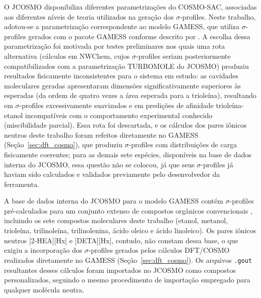 O JCOSMO disponibiliza diferentes parametrizações do COSMO-SAC, associadas aos diferentes níveis de teoria utilizados na geração dos $\sigma$-profiles. Neste trabalho, adotou-se a parametrização correspondente ao modelo GAMESS, que utiliza $\sigma$-profiles gerados com o pacote GAMESS conforme descrito por . A escolha dessa parametrização foi motivada por testes preliminares nos quais uma rota alternativa (cálculos em NWChem, cujos $\sigma$-profiles seriam posteriormente compatibilizados com a parametrização TURBOMOLE do JCOSMO) produziu resultados fisicamente inconsistentes para o sistema em estudo: as cavidades moleculares geradas apresentaram dimensões significativamente superiores às esperadas (da ordem de quatro vezes a área esperada para a trioleína), resultando em $\sigma$-profiles excessivamente suavizados e em predições de afinidade trioleína-etanol incompatíveis com o comportamento experimental conhecido (miscibilidade parcial). Essa rota foi descartada, e os cálculos dos pares iônicos neutros deste trabalho foram refeitos diretamente no GAMESS (Seção~\ref{sec:dft_cosmo}), que produziu $\sigma$-profiles com distribuições de carga fisicamente coerentes; para as demais sete espécies, disponíveis na base de dados interna do JCOSMO, essa questão não se colocou, já que seus $\sigma$-profiles já haviam sido calculados e validados previamente pelo desenvolvedor da ferramenta.



A base de dados interna do JCOSMO para o modelo GAMESS contém $\sigma$-profiles pré-calculados para um conjunto extenso de compostos orgânicos convencionais \cite{mullins2006}, incluindo os sete compostos moleculares deste trabalho (etanol, metanol, trioleína, trilinoleína, trilinolenina, ácido oleico e ácido linoleico). Os pares iônicos neutros [2-HEA][Hx] e [DETA][Hx], contudo, não constam dessa base, o que exigiu a incorporação dos $\sigma$-profiles gerados pelos cálculos DFT/COSMO realizados diretamente no GAMESS (Seção~\ref{sec:dft_cosmo}). Os arquivos \texttt{.gout} resultantes desses cálculos foram importados no JCOSMO como compostos personalizados, seguindo o mesmo procedimento de importação empregado para qualquer molécula neutra.

